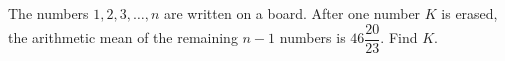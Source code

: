 The numbers $1,2,3,\dots,n$ are written on a board. After one number $K$ is erased, the arithmetic mean of the remaining $n-1$ numbers is $46\dfrac{20}{23}$. Find $K$.
